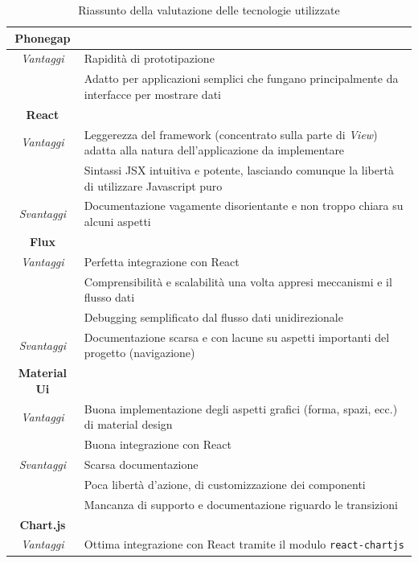 \begin{table} [H] \centering
\begin{tabularx}{\textwidth}{|c|X|}
\hline
\textbf{Phonegap} & \\ \hline
\textit{Vantaggi}
& Rapidità di prototipazione \\ \hline
& Adatto per applicazioni semplici che fungano principalmente da interfacce per mostrare dati \\ \hline \hline
\textbf{React} & \\ \hline
\textit{Vantaggi}
& Leggerezza del framework (concentrato sulla parte di \textit{View}) adatta alla natura dell'applicazione da implementare \\ \hline
& Sintassi JSX intuitiva e potente, lasciando comunque la libertà di utilizzare Javascript puro \\ \hline
\textit{Svantaggi}
& Documentazione vagamente disorientante e non troppo chiara su alcuni aspetti \\ \hline \hline
\textbf{Flux} & \\ \hline
\textit{Vantaggi}
& Perfetta integrazione con React \\ \hline
& Comprensibilità e scalabilità una volta appresi meccanismi e il flusso dati \\ \hline
& Debugging semplificato dal flusso dati unidirezionale \\ \hline 
\textit{Svantaggi}
& Documentazione scarsa e con lacune su aspetti importanti del progetto (navigazione) \\ \hline
\hline
\textbf{Material Ui} & \\ \hline
\textit{Vantaggi}
& Buona implementazione degli aspetti grafici (forma, spazi, ecc.) di material design \\ \hline
& Buona integrazione con React \\ \hline
\textit{Svantaggi}
& Scarsa documentazione \\ \hline
& Poca libertà d'azione, di customizzazione dei componenti \\ \hline
& Mancanza di supporto e documentazione riguardo le transizioni \\ \hline \hline
\textbf{Chart.js} & \\ \hline
\textit{Vantaggi}
& Ottima integrazione con React tramite il modulo \texttt{react-chartjs} \\ \hline
\end{tabularx}
\caption{Riassunto della valutazione delle tecnologie utilizzate}
\end{table}